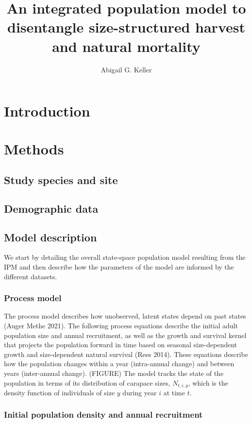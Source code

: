 \documentclass{article}
\title{An integrated population model to disentangle size-structured harvest and natural mortality}
\author{Abigail G. Keller}
\begin{document}
\maketitle

\section{Introduction}

\section{Methods}

\subsection{Study species and site}

\subsection{Demographic data}

\subsection{Model description}

We start by detailing the overall state-space population model resulting from the IPM and then describe how the parameters of the model are informed by the different datasets.

\subsubsection{Process model}

The process model describes how unobserved, latent states depend on past states (Auger Methe 2021). The following process equations describe the initial adult population size and annual recruitment, as well as the growth and survival kernel that projects the population forward in time based on seasonal size-dependent growth and size-dependent natural survival (Rees 2014). These equations describe how the population changes within a year (intra-annual change) and between years (inter-annual change). (FIGURE) The model tracks the state of the population in terms of its distribution of carapace sizes, $N_{t, i, y}$, which is the density function of individuals of size $y$ during year $i$ at time $t$. 

\subsubsection*{Initial population density and annual recruitment}
\end{document}

